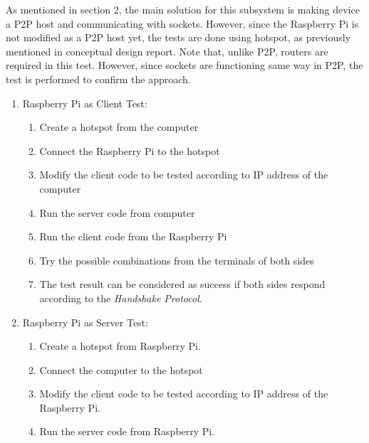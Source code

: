 \documentclass[a4paper,12pt]{article}
\begin{document}
\begin{enumerate}
As mentioned in section 2, the main solution for this subsystem is making device a P2P host and communicating with sockets. However, since the Raspberry Pi is not modified as a P2P host yet, the tests are done using hotspot, as previously mentioned in conceptual design report. Note that, unlike P2P, routers are required in this test. However, since sockets are functioning same way in P2P, the test is performed to confirm the approach.

\begin{enumerate}


\item Raspberry Pi as Client Test:


\begin{enumerate}

\item Create a hotspot from the computer  

\item Connect the Raspberry Pi to the hotspot  

\item Modify the client code to be tested according to IP address of the computer

\item Run the server code from computer  

\item Run the client code from the Raspberry Pi  

\item Try the possible combinations from the terminals of both sides  

\item The test result can be considered as success if both sides respond according to the \textit{Handshake Protocol}.

\end{enumerate}		


\item Raspberry Pi as Server Test:


\begin{enumerate}

\item Create a hotspot from Raspberry Pi.  

\item Connect the computer to the hotspot  

\item Modify the client code to be tested according to IP address of the Raspberry Pi.  

\item Run the server code from Raspberry Pi.  


\end{enumerate}
\end{enumerate}
\end{enumerate}
\end{document}
